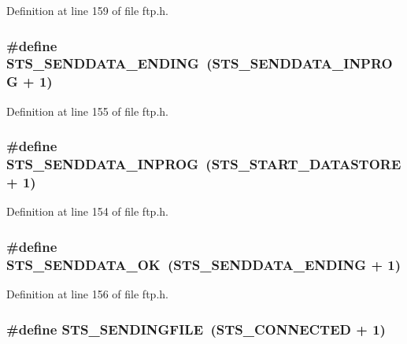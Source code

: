 Definition at line 159 of file ftp.h.

\hypertarget{group__ftp_ga4ab0222f5cbb2d0a6d1c7eae704ecb6e}{
\subsubsection[{STS\_\-SENDDATA\_\-ENDING}]{\setlength{\rightskip}{0pt plus 5cm}\#define STS\_\-SENDDATA\_\-ENDING~(STS\_\-SENDDATA\_\-INPROG + 1)}}
\label{group__ftp_ga4ab0222f5cbb2d0a6d1c7eae704ecb6e}


Definition at line 155 of file ftp.h.

\hypertarget{group__ftp_ga7b458125d1689f371be4a21634a64d44}{
\subsubsection[{STS\_\-SENDDATA\_\-INPROG}]{\setlength{\rightskip}{0pt plus 5cm}\#define STS\_\-SENDDATA\_\-INPROG~(STS\_\-START\_\-DATASTORE + 1)}}
\label{group__ftp_ga7b458125d1689f371be4a21634a64d44}


Definition at line 154 of file ftp.h.

\hypertarget{group__ftp_ga0b465a6954f60bdf103c9d38a7583f5e}{
\subsubsection[{STS\_\-SENDDATA\_\-OK}]{\setlength{\rightskip}{0pt plus 5cm}\#define STS\_\-SENDDATA\_\-OK~(STS\_\-SENDDATA\_\-ENDING + 1)}}
\label{group__ftp_ga0b465a6954f60bdf103c9d38a7583f5e}


Definition at line 156 of file ftp.h.

\hypertarget{group__ftp_ga36c56c6a5468beffe87cf4356794003a}{
\subsubsection[{STS\_\-SENDINGFILE}]{\setlength{\rightskip}{0pt plus 5cm}\#define STS\_\-SENDINGFILE~(STS\_\-CONNECTED + 1)}}
\label{group__ftp_ga36c56c6a5468beffe87cf4356794003a}


